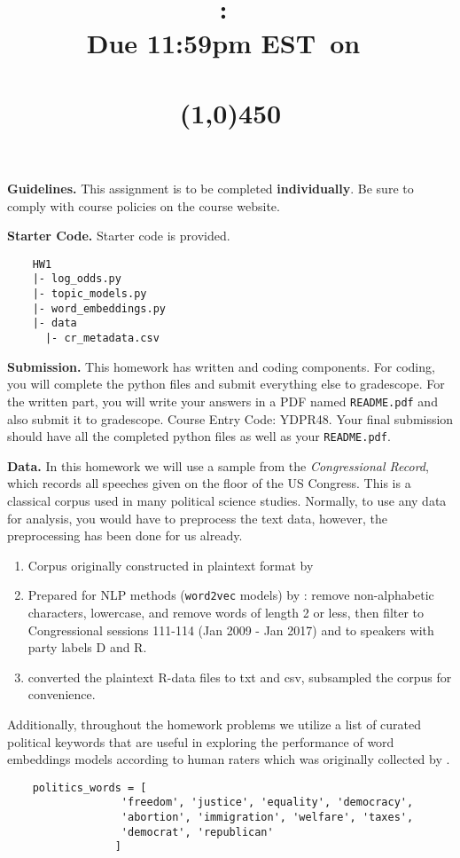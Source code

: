 \documentclass{article}
\title{
    \vspace{-1in}
    \textmd{\textbf{\hmwkClass:\ \hmwkTitle}}\\
    \normalsize\vspace{0.1in}\textmd{Due 11:59pm EST\ on\ \hmwkDueDate}\\
    \vspace{0.1in}\large{\textit{\hmwkClassInstructor}} \\
    \line(1,0){450}
}
\date{}
\begin{document}
\maketitle

\textbf{Guidelines.} 
This assignment is to be completed \textbf{individually}.
Be sure to comply with course policies on the course website.


\textbf{Starter Code.} 
Starter code is provided.


\begin{lstlisting}
    HW1
    |- log_odds.py
    |- topic_models.py
    |- word_embeddings.py
    |- data
      |- cr_metadata.csv
\end{lstlisting}

\textbf{Submission.}
This homework has written and coding components.
For coding, you will complete the python files and submit everything else to gradescope.
For the written part, you will write your answers in a PDF named \texttt{README.pdf} and also submit it to gradescope.  Course Entry Code: YDPR48.
Your final submission should have all the completed python files as well as your \texttt{README.pdf}.


\textbf{Data.}
In this homework we will use a sample from the \textit{Congressional Record}, which records all speeches given on the floor of the US Congress.
This is a classical corpus used in many political science studies.
Normally, to use any data for analysis, you would have to preprocess the text data, however, the preprocessing has been done for us already.
\begin{enumerate}
    \item Corpus originally constructed in plaintext format by \citep{gentzkow2018congressional}
    \item Prepared for NLP methods (\texttt{word2vec} models) by \citep{rodriguez2022word}: remove non-alphabetic characters, lowercase, and remove words of length 2 or less, then filter to Congressional sessions 111-114 (Jan 2009 - Jan 2017) and to speakers with party labels D and R. 
    \item \citet{stewart2022democratizing} converted the plaintext R-data files to txt and csv, subsampled the corpus for convenience.
\end{enumerate}
Additionally, throughout the homework problems we utilize a list of curated political keywords that are useful in exploring the performance of word embeddings models according to human raters which was originally collected by \citep{rodriguez2022word}.
\begin{lstlisting}
    politics_words = [
                  'freedom', 'justice', 'equality', 'democracy', 
                  'abortion', 'immigration', 'welfare', 'taxes', 
                  'democrat', 'republican'
                 ]
\end{lstlisting}
\end{document}
